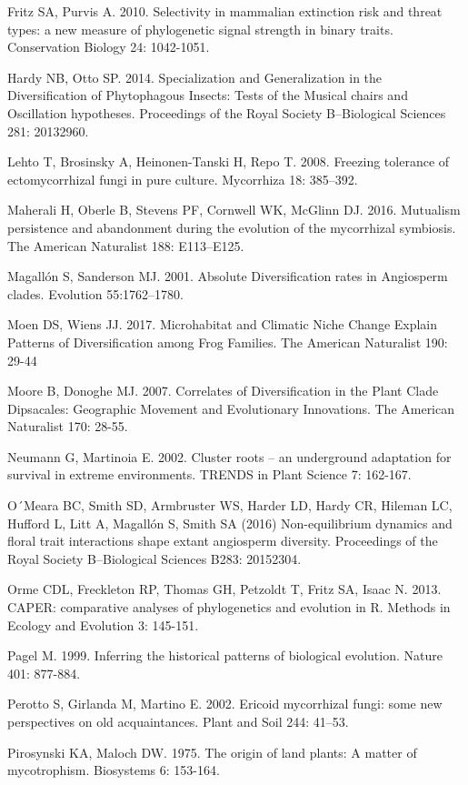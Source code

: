 \documentclass[12pt,]{article}
\begin{document}
Fritz SA, Purvis A. 2010. Selectivity in mammalian extinction risk and
threat types: a new measure of phylogenetic signal strength in binary
traits. Conservation Biology 24: 1042-1051.

Hardy NB, Otto SP. 2014. Specialization and Generalization in the
Diversification of Phytophagous Insects: Tests of the Musical chairs and
Oscillation hypotheses. Proceedings of the Royal Society B--Biological
Sciences 281: 20132960.

Lehto T, Brosinsky A, Heinonen-Tanski H, Repo T. 2008. Freezing
tolerance of ectomycorrhizal fungi in pure culture. Mycorrhiza 18:
385--392.

Maherali H, Oberle B, Stevens PF, Cornwell WK, McGlinn DJ. 2016.
Mutualism persistence and abandonment during the evolution of the
mycorrhizal symbiosis. The American Naturalist 188: E113--E125.

Magallón S, Sanderson MJ. 2001. Absolute Diversification rates in
Angiosperm clades. Evolution 55:1762--1780.

Moen DS, Wiens JJ. 2017. Microhabitat and Climatic Niche Change Explain
Patterns of Diversification among Frog Families. The American Naturalist
190: 29-44

Moore B, Donoghe MJ. 2007. Correlates of Diversification in the Plant
Clade Dipsacales: Geographic Movement and Evolutionary Innovations. The
American Naturalist 170: 28-55.

Neumann G, Martinoia E. 2002. Cluster roots -- an underground adaptation
for survival in extreme environments. TRENDS in Plant Science 7:
162-167.

O´Meara BC, Smith SD, Armbruster WS, Harder LD, Hardy CR, Hileman LC,
Hufford L, Litt A, Magallón S, Smith SA (2016) Non-equilibrium dynamics
and floral trait interactions shape extant angiosperm diversity.
Proceedings of the Royal Society B--Biological Sciences B283: 20152304.

Orme CDL, Freckleton RP, Thomas GH, Petzoldt T, Fritz SA, Isaac N. 2013.
CAPER: comparative analyses of phylogenetics and evolution in R. Methods
in Ecology and Evolution 3: 145-151.

Pagel M. 1999. Inferring the historical patterns of biological
evolution. Nature 401: 877-884.

Perotto S, Girlanda M, Martino E. 2002. Ericoid mycorrhizal fungi: some
new perspectives on old acquaintances. Plant and Soil 244: 41--53.

Pirosynski KA, Maloch DW. 1975. The origin of land plants: A matter of
mycotrophism. Biosystems 6: 153-164.
\end{document}
